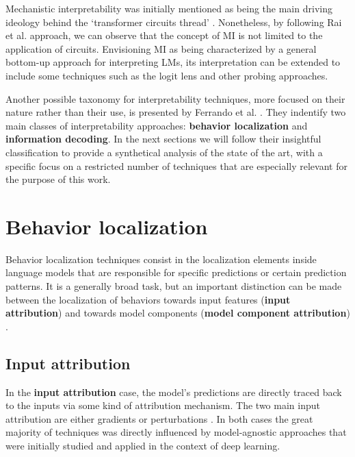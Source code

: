 Mechanistic interpretability was initially mentioned as being the main driving ideology behind the `transformer circuits thread' .
Nonetheless, by following Rai et al. \cite{rai2024} approach, we can observe that the concept of MI is not limited to the application of circuits.
Envisioning MI as being characterized by a general bottom-up approach for interpreting LMs, its interpretation can be extended to include some  techniques such as the logit lens  and other probing approaches.

Another possible taxonomy for interpretability techniques, more focused on their nature rather than their use, is presented by Ferrando et al. \cite{ferrando2024}.
They indentify two main classes of interpretability approaches: \textbf{behavior localization} and \textbf{information decoding}.
In the next sections we will follow their insightful classification to provide a synthetical analysis of the state of the art, with a specific focus on a restricted number of techniques that are especially relevant for the purpose of this work.

\section{Behavior localization}

Behavior localization techniques consist in the localization elements inside language models that are responsible for specific predictions or certain prediction patterns.
It is a generally broad task, but an important distinction can be made between the localization of behaviors towards input features (\textbf{input attribution}) and towards model components (\textbf{model component attribution}) \cite{ferrando2024}. 

\subsection{Input attribution}

In the \textbf{input attribution} case, the model's predictions are directly traced back to the inputs via some kind of attribution mechanism.
The two main input attribution  are either gradients \cite{denil2014, ding2021, sanyal2021, enguehard2023} or perturbations \cite{li2016, amara2024, mohebbi2023}.
In both cases the great majority of techniques was directly influenced by model-agnostic approaches \cite{sundararajan2017, smilkov2017, ribeiro2016, lundberg2017} that were initially studied and applied in the context of deep learning.

